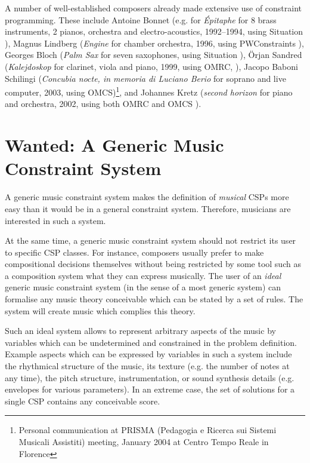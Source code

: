 \documentclass{scrartcl}
\begin{document}
A number of well-established composers already made extensive use of constraint programming. These include Antoine Bonnet (e.g. for \emph{\'Epitaphe} for 8 brass instruments, 2 pianos, orchestra and electro-acoustics, 1992--1994, using Situation \citep{Bresson:etAl:OpenMusic5:2005}), Magnus Lindberg (\emph{Engine} for chamber orchestra, 1996, using PWConstraints \citep{Rueda:1998}), Georges Bloch (\emph{Palm Sax} for seven saxophones, using Situation \citep{Rueda:1998}), \"Orjan Sandred (\emph{Kalejdoskop} for clarinet, viola and piano, 1999, using OMRC, \citep{Sandred:PRISMA01:2003}), Jacopo Baboni Schilingi (\emph{Concubia nocte, in memoria di Luciano Berio} for soprano and live computer, 2003, using OMCS)\footnote{Personal communication at PRISMA (Pedagogia e Ricerca sui Sistemi Musicali Assistiti) meeting, January 2004 at Centro Tempo Reale in Florence}, and Johannes Kretz (\emph{second horizon} for piano and orchestra, 2002, using both OMRC and OMCS \citep{Kretz:PRISMA01:2003}).


\section{Wanted: A Generic Music Constraint System}

A generic music constraint system makes the definition of \emph{musical} CSPs more easy than it would be in a general constraint system. Therefore, musicians are interested in such a system.

At the same time, a generic music constraint system should not restrict its user to specific CSP classes. For instance, composers usually prefer to make compositional decisions themselves without being restricted by some tool such as a composition system what they can express musically. The user of an \emph{ideal} generic music constraint system (in the sense of a most generic system) can formalise any music theory conceivable which can be stated by a set of rules. The system will create music which complies this theory. 

Such an ideal system allows to represent arbitrary aspects of the music by variables which can be undetermined and constrained in the problem definition. %
Example aspects which can be expressed by variables in such a system include the rhythmical structure of the music, its texture (e.g. the number of notes at any time), the pitch structure, instrumentation, or sound synthesis details (e.g. envelopes for various parameters).
In an extreme case, the set of solutions for a single CSP contains any conceivable score. %
\end{document}
